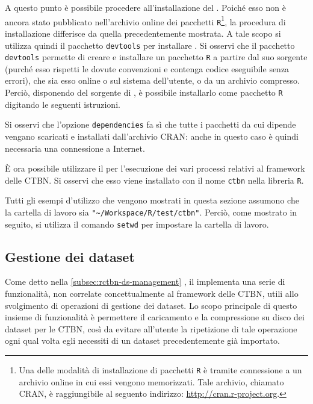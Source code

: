 A questo punto è possibile procedere all'installazione del \pacchettor{}. Poiché esso non è ancora stato pubblicato nell'archivio online dei pacchetti \lstinline$R$\footnote{Una delle modalità di installazione di pacchetti \lstinline$R$ è tramite connessione a un archivio online in cui essi vengono memorizzati. Tale archivio, chiamato \acf{CRAN}, è raggiungibile al seguento indirizzo: \url{http://cran.r-project.org}.}, la procedura di installazione differisce da quella precedentemente mostrata. A tale scopo si utilizza quindi il pacchetto \lstinline$devtools$ per installare \rctbn{}. Si osservi che il pacchetto \lstinline$devtools$ permette di creare e installare un pacchetto \lstinline$R$ a partire dal suo sorgente (purché esso rispetti le dovute convenzioni e contenga codice eseguibile senza errori), che sia esso online o sul sistema dell'utente, o da un archivio compresso. Perciò, disponendo del sorgente di \rctbn{}, è possibile installarlo come pacchetto \lstinline$R$ digitando le seguenti istruzioni.

\vspace*{8pt}

Si osservi che l'opzione \lstinline$dependencies$ fa sì che tutte i pacchetti da cui \rctbn{} dipende vengano scaricati e installati dall'archivio \acs{CRAN}: anche in questo caso è quindi necessaria una connessione a Internet.

\`E ora possibile utilizzare il \pacchettor{} per l'esecuzione dei vari processi relativi al framework delle \acs{CTBN}. Si osservi che esso viene installato con il nome \lstinline$ctbn$ nella libreria \lstinline$R$.

Tutti gli esempi d'utilizzo che vengono mostrati in questa sezione assumono che la cartella di lavoro sia \lstinline[language=rstats]{"~/Workspace/R/test/ctbn"}. Perciò, come mostrato in seguito, si utilizza il comando \lstinline$setwd$ per impostare la cartella di lavoro.

\subsection{Gestione dei dataset}
Come detto nella \autoref{subsec:rctbn-ds-management} , il \pacchettor{} implementa una serie di funzionalità, non correlate concettualmente al framework delle \acs{CTBN}, utili allo svolgimento di operazioni di gestione dei dataset. Lo scopo principale di questo insieme di funzionalità è permettere il caricamento e la compressione su disco dei dataset per le \acs{CTBN}, così da evitare all'utente la ripetizione di tale operazione ogni qual volta egli necessiti di un dataset precedentemente già importato.

